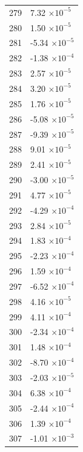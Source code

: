 \documentclass[a4paper,11pt]{article}
\begin{document}
\begin{center}
\begin{longtable}{|R{1.5cm}|R{2.5cm}|}
  279 &         7.32 $\times 10^{          -5}$ \\
  280 &         1.50 $\times 10^{          -5}$ \\
  281 &        -5.34 $\times 10^{          -5}$ \\
  282 &        -1.38 $\times 10^{          -4}$ \\
  283 &         2.57 $\times 10^{          -5}$ \\
  284 &         3.20 $\times 10^{          -5}$ \\
  285 &         1.76 $\times 10^{          -5}$ \\
  286 &        -5.08 $\times 10^{          -5}$ \\
  287 &        -9.39 $\times 10^{          -5}$ \\
  288 &         9.01 $\times 10^{          -5}$ \\
  289 &         2.41 $\times 10^{          -5}$ \\
  290 &        -3.00 $\times 10^{          -5}$ \\
  291 &         4.77 $\times 10^{          -5}$ \\
  292 &        -4.29 $\times 10^{          -4}$ \\
  293 &         2.84 $\times 10^{          -5}$ \\
  294 &         1.83 $\times 10^{          -4}$ \\
  295 &        -2.23 $\times 10^{          -4}$ \\
  296 &         1.59 $\times 10^{          -4}$ \\
  297 &        -6.52 $\times 10^{          -4}$ \\
  298 &         4.16 $\times 10^{          -5}$ \\
  299 &         4.11 $\times 10^{          -4}$ \\
  300 &        -2.34 $\times 10^{          -4}$ \\
  301 &         1.48 $\times 10^{          -4}$ \\
  302 &        -8.70 $\times 10^{          -4}$ \\
  303 &        -2.03 $\times 10^{          -5}$ \\
  304 &         6.38 $\times 10^{          -4}$ \\
  305 &        -2.44 $\times 10^{          -4}$ \\
  306 &         1.39 $\times 10^{          -4}$ \\
  307 &        -1.01 $\times 10^{          -3}$ \\

\end{longtable}
\end{center}
\end{document}

